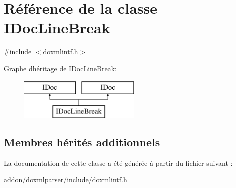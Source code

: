 \hypertarget{class_i_doc_line_break}{}\section{Référence de la classe I\+Doc\+Line\+Break}
\label{class_i_doc_line_break}


{\ttfamily \#include $<$doxmlintf.\+h$>$}

Graphe d\textquotesingle{}héritage de I\+Doc\+Line\+Break\+:\begin{figure}[H]
\begin{center}
\leavevmode
\includegraphics[height=2.000000cm]{class_i_doc_line_break}
\end{center}
\end{figure}
\subsection*{Membres hérités additionnels}


La documentation de cette classe a été générée à partir du fichier suivant \+:\begin{DoxyCompactItemize}
\item 
addon/doxmlparser/include/\hyperlink{include_2doxmlintf_8h}{doxmlintf.\+h}\end{DoxyCompactItemize}
